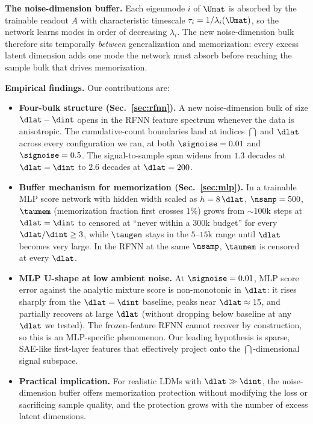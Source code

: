 \textbf{The noise-dimension buffer.}
Each eigenmode $i$ of $\Umat$ is absorbed by the trainable readout
$A$ with characteristic timescale $\tau_i = 1/\lambda_i(\Umat)$, so
the network learns modes in order of decreasing $\lambda_i$. The
new noise-dimension bulk therefore sits temporally \emph{between}
generalization and memorization: every excess latent dimension adds
one mode the network must absorb before reaching the sample bulk
that drives memorization.

\textbf{Empirical findings.}
Our contributions are:
\begin{itemize}\itemsep1pt
\item \textbf{Four-bulk structure (Sec.~\ref{sec:rfnn}).} A new
      noise-dimension bulk of size $\dlat - \dint$ opens in the RFNN
      feature spectrum whenever the data is anisotropic. The
      cumulative-count boundaries land at indices $\dint$ and $\dlat$
      across every configuration we ran, at both $\signoise = 0.01$
      and $\signoise = 0.5$. The signal-to-sample span widens from
      $1.3$ decades at $\dlat = \dint$ to $2.6$ decades at $\dlat =
      200$.
\item \textbf{Buffer mechanism for memorization
      (Sec.~\ref{sec:mlp}).} In a trainable MLP score network with
      hidden width scaled as $h = 8\,\dlat$, $\nsamp = 500$,
      $\taumem$ (memorization fraction first crosses $1\%$) grows
      from $\sim 100\text{k}$ steps at $\dlat = \dint$ to censored at
      ``never within a $300\text{k}$ budget'' for every
      $\dlat / \dint \geq 3$, while $\taugen$ stays in the
      $5$--$15\text{k}$ range until $\dlat$ becomes very large. In
      the RFNN at the same $\nsamp$, $\taumem$ is censored at every
      $\dlat$.
\item \textbf{MLP U-shape at low ambient noise.} At $\signoise =
      0.01$, MLP score error against the analytic mixture score is
      non-monotonic in $\dlat$: it rises sharply from the
      $\dlat = \dint$ baseline, peaks near $\dlat \approx 15$, and
      partially recovers at large $\dlat$ (without dropping below
      baseline at any $\dlat$ we tested). The frozen-feature RFNN
      cannot recover by construction, so this is an MLP-specific
      phenomenon. Our leading hypothesis is sparse, SAE-like
      first-layer features that effectively project onto the
      $\dint$-dimensional signal subspace.
\item \textbf{Practical implication.} For realistic LDMs with
      $\dlat \gg \dint$, the noise-dimension buffer offers
      memorization protection without modifying the loss or
      sacrificing sample quality, and the protection grows with the
      number of excess latent dimensions.
\end{itemize}
